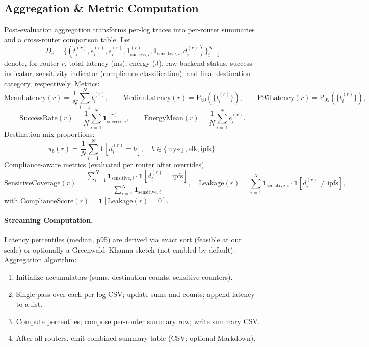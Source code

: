 \subsection{Aggregation \& Metric Computation}
\label{s:orchestration-aggregation}
Post-evaluation aggregation transforms per-log traces into per-router summaries and a cross-router comparison table. Let
\[
D_r = \{ (t_i^{(r)}, e_i^{(r)}, s_i^{(r)}, \mathbf{1}_{\text{success},i}^{(r)}, \mathbf{1}_{\text{sensitive},i}, d_i^{(r)}) \}_{i=1}^{N}
\]
denote, for router $r$, total latency (ms), energy (J), raw backend status, success indicator, sensitivity indicator (compliance classification), and final destination category, respectively. Metrics:
\[
\text{MeanLatency}(r)=\frac{1}{N}\sum_{i=1}^{N} t_i^{(r)}, \qquad
\text{MedianLatency}(r)=\text{P}_{50}(\{t_i^{(r)}\}), \qquad
\text{P95Latency}(r)=\text{P}_{95}(\{t_i^{(r)}\}),
\]
\[
\text{SuccessRate}(r)=\frac{1}{N}\sum_{i=1}^N \mathbf{1}_{\text{success},i}^{(r)}, \qquad
\text{EnergyMean}(r)=\frac{1}{N}\sum_{i=1}^N e_i^{(r)}.
\]
Destination mix proportions:
\[
\pi_{b}(r)=\frac{1}{N}\sum_{i=1}^N \mathbf{1}[d_i^{(r)}=b], \quad b \in \{\text{mysql},\text{elk},\text{ipfs}\}.
\]
Compliance-aware metrics (evaluated per router after overrides)
\[
\text{SensitiveCoverage}(r)=\frac{\sum_{i=1}^N \mathbf{1}_{\text{sensitive},i}\cdot \mathbf{1}[d_i^{(r)}=\text{ipfs}]}{\sum_{i=1}^N \mathbf{1}_{\text{sensitive},i}}, \quad
\text{Leakage}(r) = \sum_{i=1}^N \mathbf{1}_{\text{sensitive},i}\cdot \mathbf{1}[d_i^{(r)}\neq \text{ipfs}],
\]
with $\text{ComplianceScore}(r) = \mathbf{1}[\text{Leakage}(r)=0]$.

\paragraph{Streaming Computation.} Latency percentiles (median, p95) are derived via exact sort (feasible at our scale) or optionally a Greenwald--Khanna sketch (not enabled by default). Aggregation algorithm:
\begin{enumerate}
    \item Initialize accumulators (sums, destination counts, sensitive counters).
    \item Single pass over each per-log CSV; update sums and counts; append latency to a list.
    \item Compute percentiles; compose per-router summary row; write summary CSV.
    \item After all routers, emit combined summary table (CSV; optional Markdown).
\end{enumerate}

